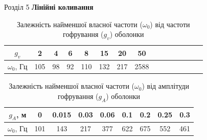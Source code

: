 \documentclass[handout, 8pt]{beamer}
\numberwithin{figure}{section}
\numberwithin{equation}{section}
\numberwithin{table}{section}
\begin{document}
\begin{frame}{Розділ 5}
\textbf{Лінійні коливання}
\\
\begin{table}[h!]
\caption{Залежність найменшої власної частоти ($\omega_0$) від частоти гофрування ($g_v$) оболонки}
\centering
 \begin{tabular}{| c | c | c | c | c | c | c | c | c | c | c | c | c | c | c |} 
 \hline
 $g_v$ & 2 & 4 & 6 & 8 & 15 & 20 & 50 \\ 
  \hline
 $\omega_0$, Гц & 105 & 98 & 92 & 110 & 132 & 217 & 2588\\
   \hline
\end{tabular}%
\end{table}

\begin{table}[h!]
\caption{Залежність найменшої власної частоти ($\omega_0$) від амплітуди гофрування ($g_A$) оболонки}
\centering
 \begin{tabular}{| c | c | c | c | c | c | c | c | c |} 
 \hline
 $g_A$, м & 0 & 0.015 & 0.03 & 0.06 & 0.1 & 0.2 & 0.25 & 0.3 \\ 
  \hline
 $\omega_0$, Гц & 101 & 143 & 217 & 377 & 622 & 675 & 552 & 461\\
   \hline
\end{tabular}
\end{table}


\end{frame}
\end{document}
